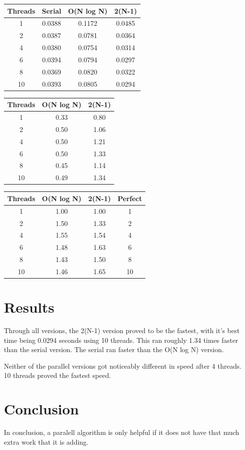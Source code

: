 \documentclass[10pt,twocolumn]{article}
\begin{document}
\begin{table}[H]\centering\small
\begin{tabular}{c|c|c|c}
Threads & Serial & O(N log N) & 2(N-1) \\ \hline
1  & 0.0388 & 0.1172 & 0.0485 \\
2  & 0.0387 & 0.0781 & 0.0364 \\
4  & 0.0380 & 0.0754 & 0.0314 \\
6  & 0.0394 & 0.0794 & 0.0297 \\
8  & 0.0369 & 0.0820 & 0.0322 \\
10 & 0.0393 & 0.0805 & 0.0294 \\
\end{tabular}
\end{table}

\begin{table}[H]\centering\small
\begin{tabular}{c|c|c}
Threads & O(N log N) & 2(N-1) \\ \hline
1  & 0.33 & 0.80 \\
2  & 0.50 & 1.06 \\
4  & 0.50 & 1.21 \\
6  & 0.50 & 1.33 \\
8  & 0.45 & 1.14 \\
10 & 0.49 & 1.34 \\
\end{tabular}
\end{table}

\begin{table}[H]\centering\small
\begin{tabular}{c|c|c|c}
Threads & O(N log N) & 2(N-1) & Perfect \\ \hline
1  & 1.00 & 1.00 & 1  \\
2  & 1.50 & 1.33 & 2  \\
4  & 1.55 & 1.54 & 4  \\
6  & 1.48 & 1.63 & 6  \\
8  & 1.43 & 1.50 & 8  \\
10 & 1.46 & 1.65 & 10 \\
\end{tabular}
\end{table}

\section{Results}
Through all versions, the 2(N-1) version proved to be the fastest, with it's best time being 0.0294 seconds using 10 threads. This ran roughly 1.34 times faster than the serial version. The serial ran faster than the O(N log N) version. 

Neither of the parallel versions got noticeably different in speed after 4 threads. 10 threads proved the fastest speed.

\section{Conclusion}
In conclusion, a paralell algorithm is only helpful if it does not have that much extra work that it is adding. 
\end{document}
